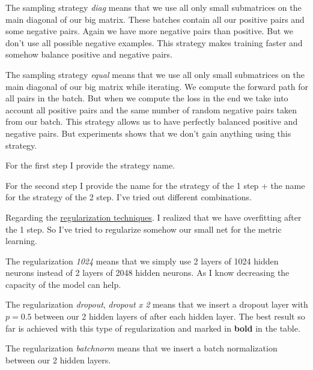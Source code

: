 \documentclass[a4paper,12pt]{extreport}
\begin{document}
    The sampling strategy \textit{diag} means that we use all only small submatrices on the main diagonal of our big matrix.
    These batches contain all our positive pairs and some negative pairs.
    Again we have more negative pairs than positive.
    But we don't use all possible negative examples.
    This strategy makes training faster and somehow balance positive and negative pairs.
    \newline

    The sampling strategy \textit{equal} means that we use all only small submatrices on the main diagonal of our big matrix while iterating.
    We compute the forward path for all pairs in the batch. But when we compute the loss in the end we take into account all positive pairs
    and the same number of random negative pairs taken from our batch. This strategy allows us to have perfectly balanced positive and negative pairs.
    But experiments shows that we don't gain anything using this strategy.
    \newline

    For the first step I provide the strategy name.

    For the second step I provide the name for the strategy of the 1 step + the name for the strategy of the 2 step.
    I've tried out different combinations.
    \newline

    Regarding the \underline{regularization techniques}. I realized that we have overfitting after the 1 step.
    So I've tried to regularize somehow our small net for the metric learning.
    \newline

    The regularization \textit{1024} means that we simply use 2 layers of 1024 hidden neurons instead
    of 2 layers of 2048 hidden neurons. As I know decreasing the capacity of the model can help.
    \newline

    The regularization \textit{dropout}, \textit{dropout x 2} means that we insert a dropout layer with $p=0.5$
    between our 2 hidden layers of after each hidden layer.
    The best result so far is achieved with this type of regularization and marked in \textbf{bold} in the table.
    \newline

    The regularization \textit{batchnorm} means that we insert a batch normalization between our 2 hidden layers.
    \newline
\end{document}
